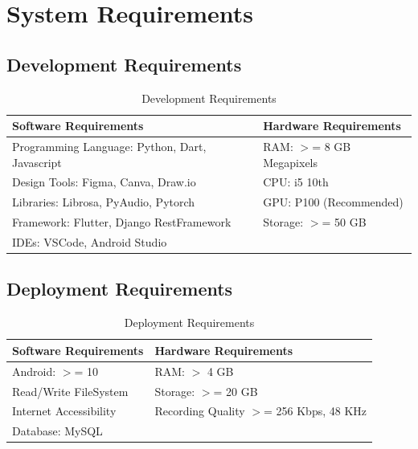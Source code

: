 \newpage
\section{System Requirements}

\subsection{Development Requirements}
\begin{table}[h]
    \centering
    \caption{Development Requirements}
    \begin{tabular}{|l|l|}
        \hline
        \textbf{Software Requirements}                 & \textbf{Hardware
        Requirements}                                                          \\ \hline
        Programming Language: Python, Dart, Javascript & RAM: \(>\)= 8 GB
        Megapixels                                                             \\ \hline
        Design Tools: Figma, Canva, Draw.io            & CPU: i5 10th
        \\ \hline
        Libraries: Librosa, PyAudio, Pytorch           & GPU: P100
        (Recommended)                                                          \\ \hline
        Framework: Flutter, Django RestFramework       & Storage: \(>\)= 50 GB
        \\ \hline
        IDEs: VSCode, Android Studio                   &
        \\ \hline
    \end{tabular}
\end{table}

\subsection{Deployment Requirements}
\begin{table}[ht]
    \centering
    \caption{Deployment Requirements}
    \begin{tabular}{|l|l|}
        \hline
        \textbf{Software Requirements} & \textbf{Hardware Requirements}
        \\ \hline
        Android: \(>\)= 10             & RAM: \(>\) 4 GB
        \\ \hline
        Read/Write FileSystem          & Storage: \(>\)= 20 GB
        \\ \hline
        Internet Accessibility         & Recording Quality \(>\)= 256 Kbps, 48
        KHz
        \\ \hline
        Database: MySQL             &                                       \\ \hline
    \end{tabular}
\end{table}

